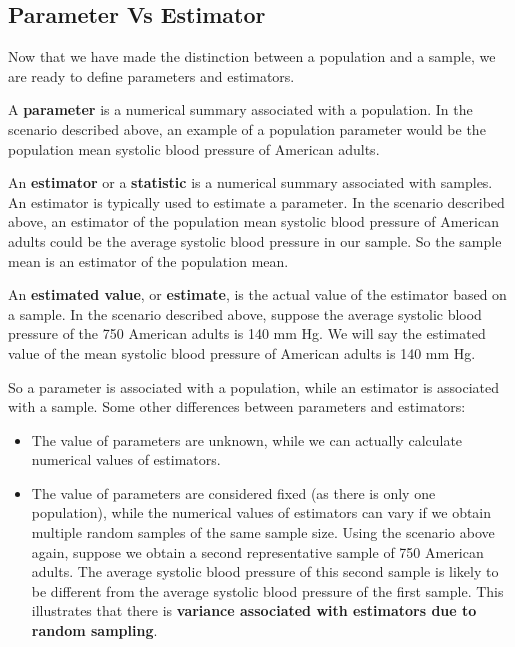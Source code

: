 \documentclass[
]{book}
\providecommand{\tightlist}{%
  \setlength{\itemsep}{0pt}\setlength{\parskip}{0pt}}
\theoremstyle{definition}
\theoremstyle{definition}
\theoremstyle{definition}
\theoremstyle{definition}
\theoremstyle{remark}
\begin{document}
\hypertarget{parameter-vs-estimator}{%
\subsection{Parameter Vs Estimator}\label{parameter-vs-estimator}}

Now that we have made the distinction between a population and a sample, we are ready to define parameters and estimators.

A \textbf{parameter} is a numerical summary associated with a population. In the scenario described above, an example of a population parameter would be the population mean systolic blood pressure of American adults.

An \textbf{estimator} or a \textbf{statistic} is a numerical summary associated with samples. An estimator is typically used to estimate a parameter. In the scenario described above, an estimator of the population mean systolic blood pressure of American adults could be the average systolic blood pressure in our sample. So the sample mean is an estimator of the population mean.

An \textbf{estimated value}, or \textbf{estimate}, is the actual value of the estimator based on a sample. In the scenario described above, suppose the average systolic blood pressure of the 750 American adults is 140 mm Hg. We will say the estimated value of the mean systolic blood pressure of American adults is 140 mm Hg.

So a parameter is associated with a population, while an estimator is associated with a sample. Some other differences between parameters and estimators:

\begin{itemize}
\tightlist
\item
  The value of parameters are unknown, while we can actually calculate numerical values of estimators.
\item
  The value of parameters are considered fixed (as there is only one population), while the numerical values of estimators can vary if we obtain multiple random samples of the same sample size. Using the scenario above again, suppose we obtain a second representative sample of 750 American adults. The average systolic blood pressure of this second sample is likely to be different from the average systolic blood pressure of the first sample. This illustrates that there is \textbf{variance associated with estimators due to random sampling}.
\end{itemize}
\end{document}
